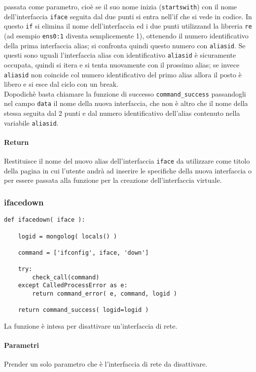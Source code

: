 \documentclass[11pt]{article}
\begin{document}
passata come parametro, cioè se il suo nome inizia (\texttt{startswith}) con il nome dell'interfaccia \texttt{iface}
seguita dal due punti si entra nell'if che si vede in codice. In questo \texttt{if}
si elimina il nome dell'interfaccia ed i due punti utilizzand la libreria \texttt{re}
(ad esempio  \texttt{ens0:1} diventa semplicemente 1), ottenendo
il numero identificativo della prima interfaccia alias; si confronta quindi questo numero con \texttt{aliasid}.
Se questi sono uguali l'interfaccia alias con identificativo \texttt{aliasid} è sicuramente occupata,
quindi si itera e si tenta nuovamente con il prossimo alias; se invece \texttt{aliasid} non coincide
col numero identificativo del primo alias allora il posto è libero e si esce dal ciclo con un break.\\
Dopodichè basta chiamare la funzione di successo \texttt{command\_success} passandogli nel campo \texttt{data}
il nome della nuova interfaccia, che non è altro che il nome della stessa seguita dal 2 punti e dal numero identificativo
dell'alias contenuto nella variabile \texttt{aliasid}.
\paragraph{Return}
Restituisce il nome del nuovo alias dell'interfaccia \texttt{iface} da utilizzare come titolo della pagina in cui l’utente
andrà ad inserire le specifiche della nuova interfaccia o per essere passata alla funzione  per
la creazione dell’interfaccia virtuale.

\subsubsection{ifacedown}\label{ifacedown}
\begin{lstlisting}
def ifacedown( iface ):
    
    logid = mongolog( locals() )

    command = ['ifconfig', iface, 'down']

    try:
        check_call(command)
    except CalledProcessError as e:
        return command_error( e, command, logid )

    return command_success( logid=logid )
\end{lstlisting}
La funzione è intesa per disattivare un'interfaccia di rete.
\paragraph{Parametri}
Prender un solo parametro che è l'interfaccia di rete da disattivare.
\end{document}
